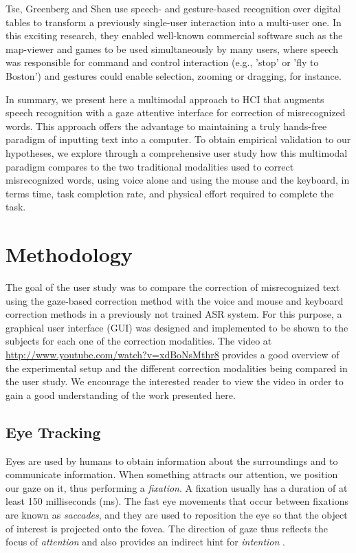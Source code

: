 \documentclass[]{article}
\begin{document}
Tse, Greenberg and Shen \cite{Tse2006} use speech- and gesture-based recognition over digital tables to transform a
previously single-user interaction into a multi-user one. In this exciting research, they enabled well-known commercial
software such as the map-viewer and games to be used simultaneously by many users, where speech was responsible for
command and control interaction (e.g., 'stop' or 'fly to Boston') and gestures could enable selection, zooming or
dragging, for instance.


In summary, we present here a multimodal approach to HCI that augments speech recognition with a gaze attentive
interface for correction of misrecognized words. This approach offers the advantage to maintaining a truly hands-free
paradigm of inputting text into a computer. To obtain empirical validation to our hypotheses, we explore through a
comprehensive user study how this multimodal paradigm compares to the two traditional modalities used to correct
misrecognized words, using voice alone and using the mouse and the keyboard, in terms time, task completion rate, and
physical effort required to complete the task.


\section{Methodology}
The goal of the user study was to compare the correction of misrecognized text using the gaze-based correction method
with the voice and mouse and keyboard correction methods in a previously not trained ASR system. For this purpose, a graphical user interface (GUI) was
designed and implemented to be shown to the subjects for each one of the correction modalities. The video at
\url{http://www.youtube.com/watch?v=xdBoNsMthr8} provides a good overview of the experimental setup and the different
correction modalities being compared in the user study. We encourage the interested reader to view the video in order to
gain a good understanding of the work presented here.


\subsection{Eye Tracking}
Eyes are used by humans to obtain information about the surroundings and to communicate information. When something
attracts our attention, we position our gaze on it, thus performing a \textit{fixation}. A fixation usually has a
duration of at least 150 milliseconds (ms). The fast eye movements that occur between fixations are known as
\textit{saccades}, and they are used to reposition the eye so that the object of interest is projected onto the fovea.
The direction of gaze thus reflects the focus of \textit{attention} and also provides an indirect hint for
\textit{intention} \cite{velichkovsky}.
\end{document}
